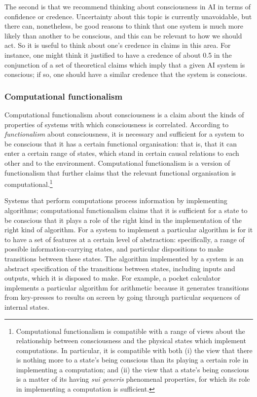 \documentclass[12pt]{article}
\begin{document}
The second is that we recommend thinking about consciousness in AI in terms of confidence or credence. Uncertainty about this topic is currently unavoidable, but there can, nonetheless, be good reasons to think that one system is much more likely than another to be conscious, and this can be relevant to how we should act. So it is useful to think about one’s credence in claims in this area. For instance, one might think it justified to have a credence of about 0.5 in the conjunction of a set of theoretical claims which imply that a given AI system is conscious; if so, one should have a similar credence that the system is conscious.

\subsubsection{Computational functionalism}

Computational functionalism about consciousness is a claim about the kinds of properties of systems with which consciousness is correlated. According to \textit{functionalism} about consciousness, it is necessary and sufficient for a system to be conscious that it has a certain functional organisation: that is, that it can enter a certain range of states, which stand in certain causal relations to each other and to the environment. Computational functionalism is a version of functionalism that further claims that the relevant functional organisation is computational.\footnote{Computational functionalism is compatible with a range of views about the relationship between consciousness and the physical states which implement computations. In particular, it is compatible with both (i) the view that there is nothing more to a state’s being conscious than its playing a certain role in implementing a computation; and (ii) the view that a state’s being conscious is a matter of its having \textit{sui generis} phenomenal properties, for which its role in implementing a computation is sufficient.}

Systems that perform computations process information by implementing algorithms; computational functionalism claims that it is sufficient for a state to be conscious that it plays a role of the right kind in the implementation of the right kind of algorithm. For a system to implement a particular algorithm is for it to have a set of features at a certain level of abstraction: specifically, a range of possible information-carrying states, and particular dispositions to make transitions between these states. The algorithm implemented by a system is an abstract specification of the transitions between states, including inputs and outputs, which it is disposed to make. For example, a pocket calculator implements a particular algorithm for arithmetic because it generates transitions from key-presses to results on screen by going through particular sequences of internal states.
\end{document}
